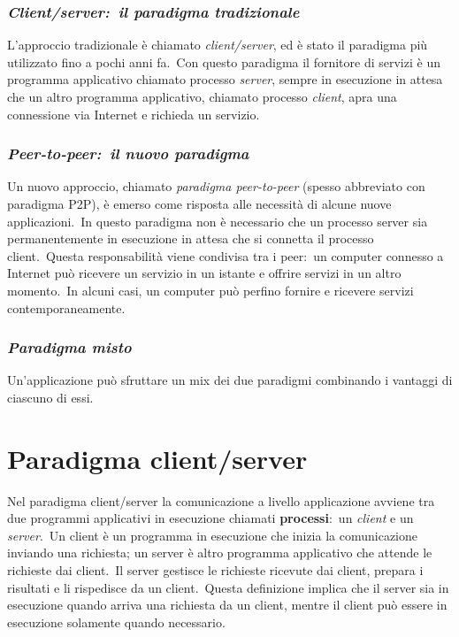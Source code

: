 \subsubsection{\emph{Client/server:\ il paradigma tradizionale}}

L'approccio tradizionale è chiamato \emph{client/server}, ed è stato il paradigma più utilizzato fino a pochi anni fa.\
Con questo paradigma il fornitore di servizi è un programma applicativo chiamato processo \emph{server}, sempre in esecuzione in attesa che un altro programma applicativo, chiamato processo \emph{client}, apra una connessione via Internet e richieda un servizio.

\subsubsection{\emph{Peer-to-peer:\ il nuovo paradigma}}

Un nuovo approccio, chiamato \emph{paradigma peer-to-peer} (spesso abbreviato con paradigma P2P), è emerso come risposta alle necessità di alcune nuove applicazioni.\
In questo paradigma non è necessario che un processo server sia permanentemente in esecuzione in attesa che si connetta il processo client.\
Questa responsabilità viene condivisa tra i peer:\ un computer connesso a Internet può ricevere un servizio in un istante e offrire servizi in un altro momento.\
In alcuni casi, un computer può perfino fornire e ricevere servizi contemporaneamente.

\subsubsection{\emph{Paradigma misto}}

Un'applicazione può sfruttare un mix dei due paradigmi combinando i vantaggi di ciascuno di essi.

\section{Paradigma client/server}

Nel paradigma client/server la comunicazione a livello applicazione avviene tra due programmi applicativi in esecuzione chiamati \textbf{processi}:\ un \emph{client} e un \emph{server}.\
Un client è un programma in esecuzione che inizia la comunicazione inviando una richiesta; un server è altro programma applicativo che attende le richieste dai client.\
Il server gestisce le richieste ricevute dai client, prepara i risultati e li rispedisce da un client.\
Questa definizione implica che il server sia in esecuzione quando arriva una richiesta da un client, mentre il client può essere in esecuzione solamente quando necessario.

